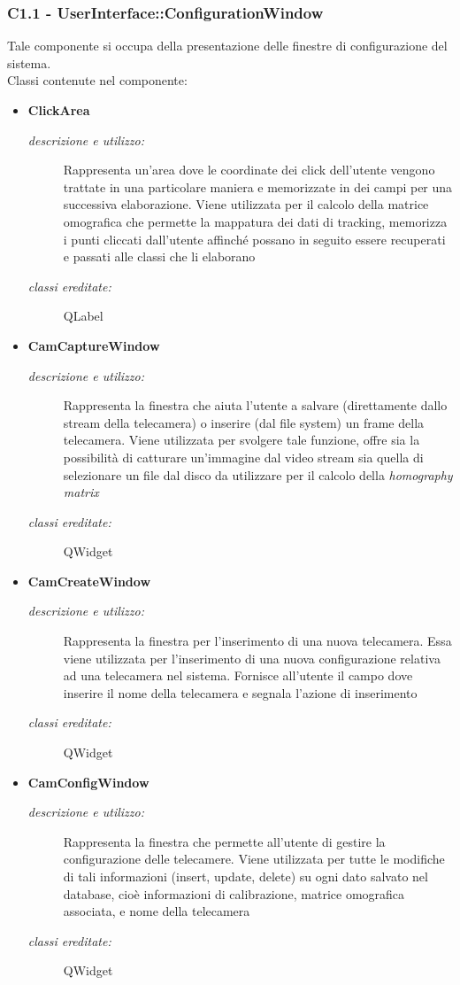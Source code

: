 \subsubsection{C1.1 - UserInterface::ConfigurationWindow} \label{sec:c1.1}
Tale componente si occupa della presentazione delle finestre di configurazione del sistema. \\
Classi contenute nel componente: 
\begin{itemize} 
\item \textbf{ClickArea}
\begin{description}
\item [\textit{descrizione e utilizzo:}] Rappresenta un'area dove le coordinate dei click dell'utente vengono trattate in una particolare maniera e memorizzate in dei campi per una successiva elaborazione. Viene utilizzata per il calcolo della matrice omografica che permette la mappatura dei dati di tracking, memorizza i punti cliccati dall'utente affinché possano in seguito essere recuperati e passati alle classi che li elaborano
\item [\textit{classi ereditate:}] QLabel
\end{description}
\item \textbf{CamCaptureWindow}
\begin{description}
\item [\textit{descrizione e utilizzo:}] Rappresenta la finestra che aiuta l'utente a salvare (direttamente dallo stream della telecamera) o inserire (dal file system) un frame della telecamera. Viene utilizzata per svolgere tale funzione, offre sia la possibilità di catturare un'immagine dal video stream sia quella di selezionare un file dal disco da utilizzare per il calcolo della \textit{homography matrix}
\item [\textit{classi ereditate:}] QWidget
\end{description}
\item \textbf{CamCreateWindow}
\begin{description}
\item [\textit{descrizione e utilizzo:}] Rappresenta la finestra per l'inserimento di una nuova telecamera. Essa viene utilizzata per l'inserimento di una nuova configurazione relativa ad una telecamera nel sistema. Fornisce all'utente il campo dove inserire il nome della telecamera e segnala l'azione di inserimento 
\item [\textit{classi ereditate:}] QWidget
\end{description}
\item \textbf{CamConfigWindow}
\begin{description}
\item [\textit{descrizione e utilizzo:}] Rappresenta la finestra che permette all'utente di gestire la configurazione delle telecamere. Viene utilizzata per tutte le modifiche di tali informazioni (insert, update, delete) su ogni dato salvato nel database, cioè informazioni di calibrazione, matrice omografica associata, e nome della telecamera
\item [\textit{classi ereditate:}] QWidget
\end{description}
\end{itemize}

